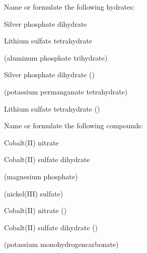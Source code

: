 \documentclass[main.tex]{subfiles}
\begin{document}
\begin{multicols*}{2}
\begin{question}[ID=\the\value{numA}]
Name or formulate the following hydrates:
\begin{inparaenum}[(a)]	
\item {}		%
\item Silver phosphate dihydrate	%
\item {}			%
\item Lithium sulfate tetrahydrate	%
\end{inparaenum}
\end{question}
\begin{solution}
\begin{inparaenum}[(a)]
\item {}		 (aluminum phosphate trihydrate)	
\item Silver phosphate dihydrate	 ()
\item {}			 (potassium permanganate tetrahydrate)
\item Lithium sulfate tetrahydrate	 ()
 \end{inparaenum}\hspace{0.1cm}\end{solution}




\begin{question}[ID=\the\value{numA}]
Name or formulate the following compounds:
\begin{inparaenum}[(a)]	
\item  {}				%
\item  {}				%
\item  Cobalt(II) nitrate			%
\item  Cobalt(II) sulfate dihydrate	%
\item {}				%
\end{inparaenum}
\end{question}
\begin{solution}
\begin{inparaenum}[(a)]
\item  {}					(magnesium phosphate)
\item  {}					(nickel(III) sulfate)
\item  Cobalt(II) nitrate				()
\item  Cobalt(II) sulfate dihydrate		()
\item {}					(potassium monohydrogencarbonate)
 \end{inparaenum}\hspace{0.1cm}\end{solution}


\end{multicols*}
\end{document}
